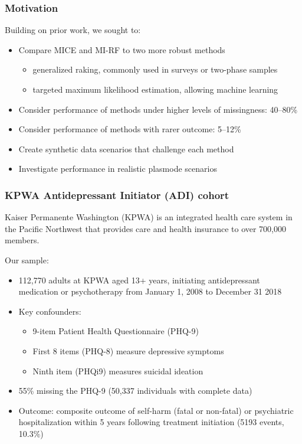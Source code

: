 \documentclass[10pt, table]{beamer}
\begin{document}
\begin{frame} \frametitle{Motivation}
  Building on prior work, we sought to: \vspace{-.4cm}
  \begin{itemize}
    \item Compare MICE and MI-RF to two more robust methods
      \begin{itemize}
        \item generalized raking, commonly used in surveys or two-phase samples
        \item targeted maximum likelihood estimation, allowing machine learning
      \end{itemize}
    \item Consider performance of methods under higher levels of missingness: 40--80\%
    \item Consider performance of methods with rarer outcome: 5--12\%
    \item Create synthetic data scenarios that challenge each method
    \item Investigate performance in realistic plasmode scenarios
\end{itemize}

\end{frame}

\begin{frame} \frametitle{KPWA Antidepressant Initiator (ADI) cohort}
  Kaiser Permanente Washington (KPWA) is an integrated health care system in the Pacific Northwest that provides care and health insurance to over 700,000 members.

  Our sample: \vspace{-.4cm}
  \begin{itemize}
    \item 112,770 adults at KPWA aged 13+ years, initiating antidepressant medication or psychotherapy from January 1, 2008 to December 31 2018
    \item Key confounders: 
    \begin{itemize}
      \item 9-item Patient Health Questionnaire (PHQ-9)
      \item First 8 items (PHQ-8) measure depressive symptoms
      \item Ninth item (PHQi9) measures suicidal ideation
    \end{itemize}
    \item 55\% missing the PHQ-9 (50,337 individuals with complete data)
    \item Outcome: composite outcome of self-harm (fatal or non-fatal) or psychiatric hospitalization within 5 years following treatment initiation (5193 events, 10.3\%) 
  \end{itemize}
\end{frame}
\end{document}
